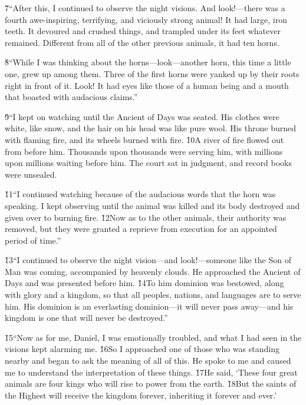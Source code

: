 \v{7}``After this, I continued to observe the night visions. And look!---there was a fourth awe-inspiring, terrifying, and viciously strong animal! It had large, iron teeth. It devoured and crushed things, and trampled under its feet whatever remained. Different from all of the other previous animals, it had ten horns.

\v{8}``While I was thinking about the horns---look---another horn, this time a little one, grew up among them. Three of the first horns were yanked up by their roots right in front of it. Look! It had eyes like those of a human being and a mouth that boasted with audacious claims.''

\v{9}``I kept on watching until the Ancient of Days was seated. His clothes were white, like snow, and the hair on his head was like pure wool. His throne burned with flaming fire, and its wheels burned with fire. \v{10}A river of fire flowed out from before him. Thousands upon thousands were serving him, with millions upon millions waiting before him. The court sat in judgment, and record books were unsealed.

\v{11}``I continued watching because of the audacious words that the horn was speaking. I kept observing until the animal was killed and its body destroyed and given over to burning fire. \v{12}Now as to the other animals, their authority was removed, but they were granted a reprieve from execution for an appointed period of time.''

\v{13}``I continued to observe the night vision---and look!---someone like the Son of Man was coming, accompanied by heavenly clouds. He approached the Ancient of Days and was presented before him. \v{14}To him dominion was bestowed, along with glory and a kingdom, so that all peoples, nations, and languages are to serve him. His dominion is an everlasting dominion---it will never pass away---and his kingdom is one that will never be destroyed.''

\v{15}``Now as for me, Daniel, I was emotionally troubled, and what I had seen in the visions kept alarming me. \v{16}So I approached one of those who was standing nearby and began to ask the meaning of all of this. He spoke to me and caused me to understand the interpretation of these things. \v{17}He said, `These four great animals are four kings who will rise to power from the earth. \v{18}But the saints of the Highest will receive the kingdom forever, inheriting it forever and ever.'

